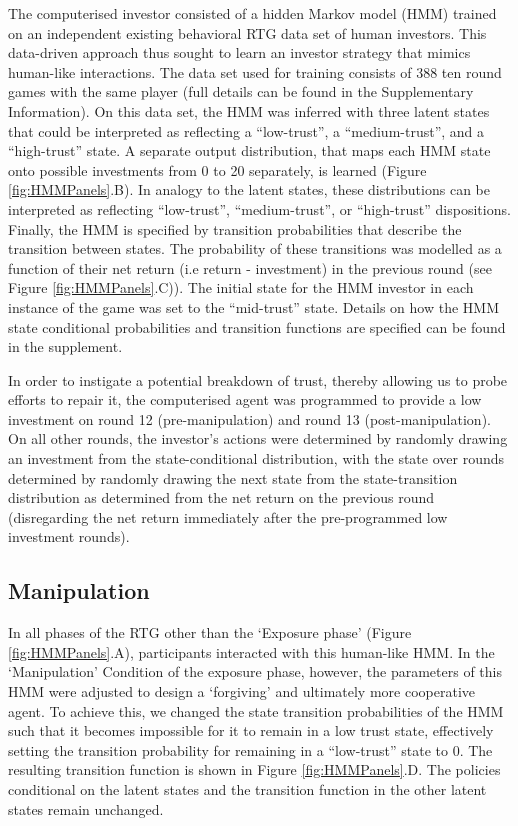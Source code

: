 \documentclass[
]{article}
\begin{document}
The computerised investor consisted of a hidden Markov model (HMM) trained on an independent existing behavioral RTG data set of human investors. This data-driven approach thus sought to learn an investor strategy that mimics human-like interactions. The data set used for training consists of 388 ten round games with the same player (full details can be found in the Supplementary Information). On this data set, the HMM was inferred with three latent states that could be interpreted as reflecting a ``low-trust'', a ``medium-trust'', and a ``high-trust'' state. A separate output distribution, that maps each HMM state onto possible investments from 0 to 20 separately, is learned (Figure \ref{fig:HMMPanels}.B). In analogy to the latent states, these distributions can be interpreted as reflecting ``low-trust'', ``medium-trust'', or ``high-trust'' dispositions. Finally, the HMM is specified by transition probabilities that describe the transition between states. The probability of these transitions was modelled as a function of their net return (i.e return - investment) in the previous round (see Figure \ref{fig:HMMPanels}.C)). The initial state for the HMM investor in each instance of the game was set to the ``mid-trust'' state. Details on how the HMM state conditional probabilities and transition functions are specified can be found in the supplement.

In order to instigate a potential breakdown of trust, thereby allowing us to probe efforts to repair it, the computerised agent was programmed to provide a low investment on round 12 (pre-manipulation) and round 13 (post-manipulation). On all other rounds, the investor's actions were determined by randomly drawing an investment from the state-conditional distribution, with the state over rounds determined by randomly drawing the next state from the state-transition distribution as determined from the net return on the previous round (disregarding the net return immediately after the pre-programmed low investment rounds).

\subsection{Manipulation}\label{manipulation}

In all phases of the RTG other than the `Exposure phase' (Figure \ref{fig:HMMPanels}.A), participants interacted with this human-like HMM. In the `Manipulation' Condition of the exposure phase, however, the parameters of this HMM were adjusted to design a `forgiving' and ultimately more cooperative agent. To achieve this, we changed the state transition probabilities of the HMM such that it becomes impossible for it to remain in a low trust state, effectively setting the transition probability for remaining in a ``low-trust'' state to 0. The resulting transition function is shown in Figure \ref{fig:HMMPanels}.D. The policies conditional on the latent states and the transition function in the other latent states remain unchanged.
\end{document}
